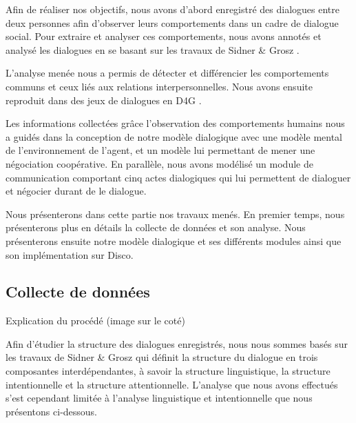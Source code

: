 \documentclass[a4paper,french]{article}
\begin{document}
\par Afin de réaliser nos objectifs, nous avons d'abord enregistré des dialogues entre deux personnes afin d'observer leurs comportements dans un cadre de dialogue social. 
Pour extraire et analyser ces comportements, nous avons annotés et analysé les dialogues  en se basant sur les travaux de Sidner \& Grosz \cite{grosz1986attention}. \par L'analyse menée nous a permis de détecter et différencier les comportements communs et ceux liés aux relations interpersonnelles. Nous avons ensuite reproduit dans des jeux de dialogues en D4G \cite{rich}. 

\par Les informations collectées grâce l'observation des comportements humains nous a guidés dans la conception de notre modèle dialogique avec une modèle mental de l'environnement de l'agent, et un modèle lui permettant de mener une négociation coopérative. 
En parallèle, nous avons modélisé un module de communication comportant cinq actes dialogiques qui lui permettent de dialoguer et négocier durant de le dialogue. 
\par Nous présenterons dans cette partie nos travaux menés. En premier temps, nous présenterons plus en détails la collecte de données et son analyse. 
	Nous présenterons ensuite notre modèle dialogique et ses différents modules ainsi que son implémentation sur Disco. 
\subsection{Collecte de données}

Explication du procédé (image sur le coté)

Afin d'étudier la structure des dialogues enregistrés, nous nous sommes basés sur les travaux de Sidner \& Grosz \cite{grosz1986attention}  qui définit la structure du dialogue en trois composantes interdépendantes, à savoir la structure linguistique, la structure intentionnelle et la structure attentionnelle. L'analyse que nous avons effectués s'est cependant limitée à l'analyse linguistique et intentionnelle que nous présentons ci-dessous. 
\end{document}
